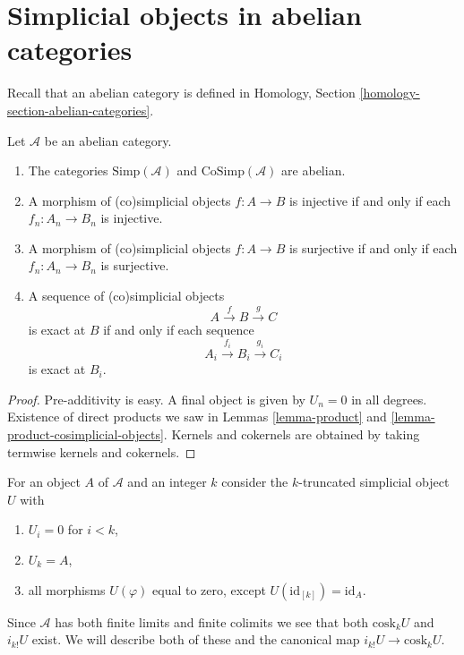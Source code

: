 \section{Simplicial objects in abelian categories}
\label{section-abelian}

\noindent
Recall that an abelian category is defined
in Homology, Section \ref{homology-section-abelian-categories}.

\begin{lemma}
\label{lemma-abelian}
Let $\mathcal{A}$ be an abelian category.
\begin{enumerate}
\item The categories $\text{Simp}(\mathcal{A})$ and
$\text{CoSimp}(\mathcal{A})$ are abelian.
\item A morphism of (co)simplicial objects
$f : A \to B$ is injective
if and only if each $f_n : A_n \to B_n$ is injective.
\item A morphism of (co)simplicial objects
$f : A \to B$ is surjective
if and only if each $f_n : A_n \to B_n$ is surjective.
\item A sequence of (co)simplicial objects
$$
A \xrightarrow{f} B \xrightarrow{g} C
$$
is exact at $B$ if and only if each sequence
$$
A_i \xrightarrow{f_i} B_i \xrightarrow{g_i} C_i
$$
is exact at $B_i$.
\end{enumerate}
\end{lemma}

\begin{proof}
Pre-additivity is easy. A final object is
given by $U_n = 0$ in all degrees.
Existence of direct products we saw in
Lemmas \ref{lemma-product} and
\ref{lemma-product-cosimplicial-objects}.
Kernels and cokernels are obtained by taking
termwise kernels and cokernels.
\end{proof}

\noindent
For an object $A$ of $\mathcal{A}$ and an integer
$k$ consider the $k$-truncated simplicial object
$U$ with
\begin{enumerate}
\item $U_i = 0$ for $i < k$,
\item $U_k = A$,
\item all morphisms $U(\varphi)$ equal to zero,
except $U(\text{id}_{[k]}) = \text{id}_A$.
\end{enumerate}
Since $\mathcal{A}$ has both finite limits and finite colimits
we see that both $\text{cosk}_k U$ and $i_{k!}U$ exist.
We will describe both of these and the canonical
map $i_{k!}U \to \text{cosk}_kU$.

